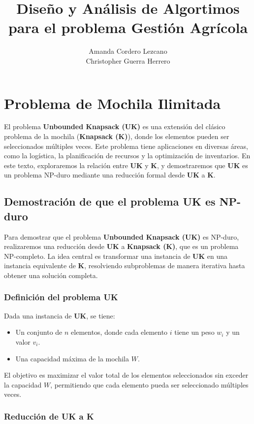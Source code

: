 \documentclass{report}
\title{Diseño y Análisis de Algortimos para el problema Gestión Agrícola}
\author{Amanda Cordero Lezcano\\Christopher Guerra Herrero}
\date{}
\begin{document}
	
	\maketitle
	\tableofcontents
	
	\chapter{Problema de Mochila Ilimitada}
El problema \textbf{Unbounded Knapsack (UK)} es una extensión del clásico problema de la mochila (\textbf{Knapsack (K)}), donde los elementos pueden ser seleccionados múltiples veces. Este problema tiene aplicaciones en diversas áreas, como la logística, la planificación de recursos y la optimización de inventarios. En este texto, exploraremos la relación entre \textbf{UK} y \textbf{K}, y demostraremos que \textbf{UK} es un problema NP-duro mediante una reducción formal desde \textbf{UK} a \textbf{K}.

\section{Demostración de que el problema UK es NP-duro}

Para demostrar que el problema \textbf{Unbounded Knapsack (UK)} es NP-duro, realizaremos una reducción desde \textbf{UK} a \textbf{Knapsack (K)}, que es un problema NP-completo. La idea central es transformar una instancia de \textbf{UK} en una instancia equivalente de \textbf{K}, resolviendo subproblemas de manera iterativa hasta obtener una solución completa.

\subsection*{Definición del problema UK}

Dada una instancia de \textbf{UK}, se tiene:
\begin{itemize}
	\item Un conjunto de \( n \) elementos, donde cada elemento \( i \) tiene un peso \( w_i \) y un valor \( v_i \).
	\item Una capacidad máxima de la mochila \( W \).
\end{itemize}

El objetivo es maximizar el valor total de los elementos seleccionados sin exceder la capacidad \( W \), permitiendo que cada elemento pueda ser seleccionado múltiples veces.

\subsection*{Reducción de UK a K}
\end{document}
